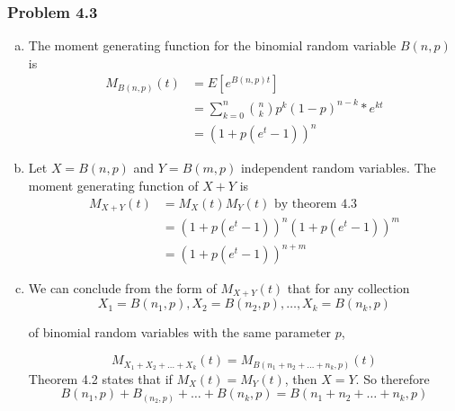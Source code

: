 \documentclass[12pt,letterpaper]{article}
\newenvironment{answer}[1]{
  \subsubsection*{Problem #1}
}{\newpage}
\begin{document}
\begin{answer}{4.3}
\begin{enumerate}[(a)]
	\item The moment generating function for the binomial random variable $B(n,p)$ is
		\begin{align*}
		M_{B(n,p)}(t) &= E[e^{B(n,p)t}] \\
			&= \sum_{k=0}^n {n \choose k} p^k(1-p)^{n-k} * e^{kt}\\
			&= (1 + p(e^t - 1))^n
		\end{align*}
	\item Let $X = B(n,p)$ and $Y = B(m, p)$ independent random variables. The moment generating function of $X + Y$ is
		\begin{align*}
		M_{X + Y}(t) &= M_X(t)M_Y(t) \text{ by theorem 4.3} \\
			&= (1 + p(e^t - 1))^n (1 + p(e^t - 1))^m \\
			&= (1 + p(e^t - 1))^{n + m}
		\end{align*}
	\item We can conclude from the form of $M_{X+Y}(t)$ that for any collection
		$$X_1 = B(n_1, p), X_2 = B(n_2, p), \ldots, X_k = B(n_k, p)$$

		 of binomial random variables with the same parameter $p$,

		 $$M_{X_1 + X_2 + \ldots + X_k}(t) = M_{B(n_1 + n_2 + \ldots + n_k, p)}(t)$$ Theorem 4.2 states that if $M_X(t) = M_Y(t)$, then $X = Y$. So therefore
		 $$B(n_1,p) + B_(n_2,p) + \ldots + B(n_k, p) = B(n_1 + n_2 + \ldots + n_k, p)$$
\end{enumerate}
\end{answer}
\end{document}
